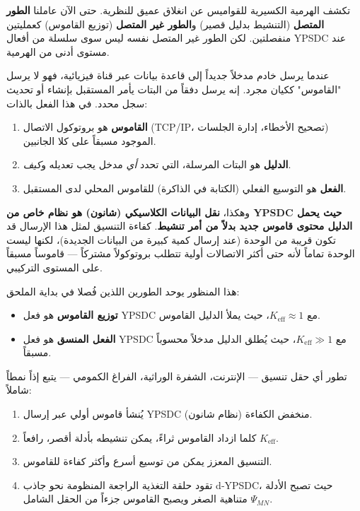 \documentclass[12pt,a4paper]{article}
\theoremstyle{remark}
\begin{document}
	تكشف الهرمية الكسيرية للقواميس عن انغلاق عميق للنظرية. حتى الآن عاملنا \textbf{الطور المتصل} (التنشيط بدليل قصير) و\textbf{الطور غير المتصل} (توزيع القاموس) كعمليتين منفصلتين. لكن الطور غير المتصل نفسه ليس سوى سلسلة من أفعال YPSDC عند مستوى أدنى من الهرمية.
	
	عندما يرسل خادم مدخلاً جديداً إلى قاعدة بيانات عبر قناة فيزيائية، فهو لا يرسل "القاموس" ككيان مجرد. إنه يرسل دفقاً من البتات يأمر المستقبل بإنشاء أو تحديث سجل محدد. في هذا الفعل بالذات:
	
	\begin{enumerate}[leftmargin=*]
		\item \textbf{القاموس} هو بروتوكول الاتصال (TCP/IP، تصحيح الأخطاء، إدارة الجلسات) الموجود مسبقاً على كلا الجانبين.
		\item \textbf{الدليل} هو البتات المرسلة، التي تحدد \emph{أي} مدخل يجب تعديله و\textit{كيف}.
		\item \textbf{الفعل} هو التوسيع الفعلي (الكتابة في الذاكرة) للقاموس المحلي لدى المستقبل.
	\end{enumerate}
	
	وهكذا، \textbf{نقل البيانات الكلاسيكي (شانون) هو نظام خاص من YPSDC حيث يحمل الدليل محتوى قاموس جديد بدلاً من أمر تنشيط}. كفاءة التنسيق لمثل هذا الإرسال قد تكون قريبة من الوحدة (عند إرسال كمية كبيرة من البيانات الجديدة)، لكنها ليست الوحدة تماماً لأنه حتى أكثر الاتصالات أولية تتطلب بروتوكولاً مشتركاً — قاموساً مسبقاً على المستوى التركيبي.
	
	هذا المنظور يوحد الطورين اللذين فُصلا في بداية الملحق:
	
	\begin{itemize}[leftmargin=*]
		\item \textbf{توزيع القاموس} هو فعل YPSDC مع \(K_{\mathrm{eff}} \approx 1\)، حيث يملأ الدليل القاموس.
		\item \textbf{الفعل المنسق} هو فعل YPSDC مع \(K_{\mathrm{eff}} \gg 1\)، حيث يُطلق الدليل مدخلاً محسوباً مسبقاً.
	\end{itemize}
	
	تطور أي حقل تنسيق — الإنترنت، الشفرة الوراثية، الفراغ الكمومي — يتبع إذاً نمطاً شاملاً:
	\begin{enumerate}[leftmargin=*]
		\item يُنشأ قاموس أولي عبر إرسال YPSDC منخفض الكفاءة (نظام شانون).
		\item كلما ازداد القاموس ثراءً، يمكن تنشيطه بأدلة أقصر، رافعاً \(K_{\mathrm{eff}}\).
		\item التنسيق المعزز يمكن من توسيع أسرع وأكثر كفاءة للقاموس.
		\item تقود حلقة التغذية الراجعة المنظومة نحو جاذب d‑YPSDC، حيث تصبح الأدلة متناهية الصغر ويصبح القاموس جزءاً من الحقل الشامل \(\Psi_{MN}\).
	\end{enumerate}
	
\end{document}
